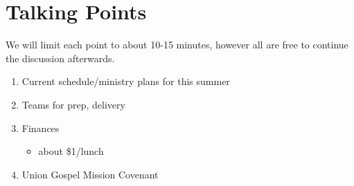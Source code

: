 \documentclass[10pt]{article}
\begin{document}
\section{Talking Points}
    We will limit each point to about 10-15 minutes, however all are free to continue the discussion afterwards.
    \begin{enumerate}
        \item{Current schedule/ministry plans for this summer}
        \item{Teams for prep, delivery}
        \item{Finances}
            \begin{itemize}\item{about \$1/lunch}\end{itemize}
        \item{Union Gospel Mission Covenant}
    \end{enumerate}
\end{document}
